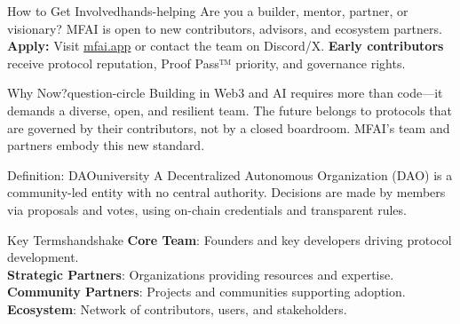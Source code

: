 \begin{mfai-box}{How to Get Involved}{hands-helping}
Are you a builder, mentor, partner, or visionary? MFAI is open to new contributors, advisors, and ecosystem partners.\newline
\textbf{Apply:} Visit \href{https://mfai.app}{mfai.app} or contact the team on Discord/X.\newline
\textbf{Early contributors} receive protocol reputation, Proof Pass™ priority, and governance rights.
\end{mfai-box}

\begin{mfai-box}{Why Now?}{question-circle}
Building in Web3 and AI requires more than code—it demands a diverse, open, and resilient team. The future belongs to protocols that are governed by their contributors, not by a closed boardroom. MFAI's team and partners embody this new standard.
\end{mfai-box}

\begin{mfai-box}{Definition: DAO}{university}
A Decentralized Autonomous Organization (DAO) is a community-led entity with no central authority. Decisions are made by members via proposals and votes, using on-chain credentials and transparent rules.
\end{mfai-box}

\begin{mfai-box}{Key Terms}{handshake}
\textbf{Core Team}: Founders and key developers driving protocol development.\\
\textbf{Strategic Partners}: Organizations providing resources and expertise.\\
\textbf{Community Partners}: Projects and communities supporting adoption.\\
\textbf{Ecosystem}: Network of contributors, users, and stakeholders.
\end{mfai-box}

